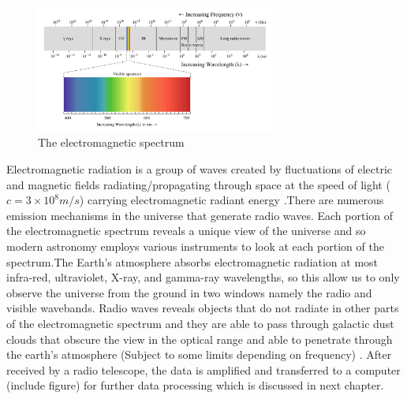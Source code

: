 \begin{figure}[h!]
  \centering
    \includegraphics[width=0.7\textwidth]{images/Electromagnetic-Spectrum.png}
    \caption{The electromagnetic spectrum}
  \label{images/Electromagnetic-Spectrum.png}
\end{figure}

Electromagnetic radiation is a group of waves created by fluctuations of electric and magnetic fields radiating/propagating through space at the speed of light ($c=3\times 10^{8} m/s$) carrying electromagnetic radiant energy \citep{staats2016genetic}.\;There are numerous emission mechanisms in the universe that generate radio waves.
Each portion of the electromagnetic spectrum reveals a unique view of the universe and so modern astronomy employs various instruments to look at each portion of the spectrum.\;The Earth's atmosphere absorbs electromagnetic radiation at most infra-red, ultraviolet, X-ray, and gamma-ray wavelengths, so this allow us to only observe the universe from the ground in two windows namely the radio and visible wavebands.  Radio waves reveals objects that do not radiate in other parts of the electromagnetic spectrum and they are able to pass through galactic dust clouds that obscure the view in the optical range and able to penetrate through the earth's atmosphere (Subject to some limits depending on frequency) \citep{thompson2001interferometry}. After received by a radio telescope, the data is amplified and transferred to a computer (include figure) for further  data processing which is discussed in next chapter.


